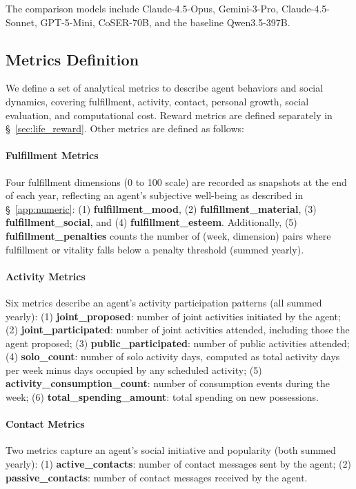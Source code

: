 The comparison models include
Claude-4.5-Opus, Gemini-3-Pro, Claude-4.5-Sonnet, GPT-5-Mini,
CoSER-70B, and the baseline Qwen3.5-397B.


\subsection{Metrics Definition}
\label{sec:appendix_metrics}

We define a set of analytical metrics to describe agent behaviors and social dynamics,
covering fulfillment, activity, contact, personal growth, social evaluation, and computational cost.
Reward metrics are defined separately in \S~\ref{sec:life_reward}.
Other metrics are defined as follows: 

\paragraph{Fulfillment Metrics}
Four fulfillment dimensions (0 to 100 scale) are recorded as snapshots at the end of each year,
reflecting an agent's subjective well-being as described in \S~\ref{app:numeric}:
(1) \textbf{fulfillment\_mood},
(2) \textbf{fulfillment\_material},
(3) \textbf{fulfillment\_social}, and
(4) \textbf{fulfillment\_esteem}.
Additionally,
(5) \textbf{fulfillment\_penalties} counts the number of (week, dimension) pairs
where fulfillment or vitality falls below a penalty threshold
(summed yearly).

\paragraph{Activity Metrics}
Six metrics describe an agent's activity participation patterns
(all summed yearly):
(1) \textbf{joint\_proposed}: number of joint activities initiated by the agent;
(2) \textbf{joint\_participated}: number of joint activities attended, including those the agent proposed;
(3) \textbf{public\_participated}: number of public activities attended;
(4) \textbf{solo\_count}: number of solo activity days, computed as total activity days per week minus days occupied by any scheduled activity;
(5) \textbf{activity\_consumption\_count}: number of consumption events during the week;
(6) \textbf{total\_spending\_amount}: total spending on new possessions.

\paragraph{Contact Metrics}
Two metrics capture an agent's social initiative and popularity
(both summed yearly):
(1) \textbf{active\_contacts}: number of contact messages sent by the agent;
(2) \textbf{passive\_contacts}: number of contact messages received by the agent.

